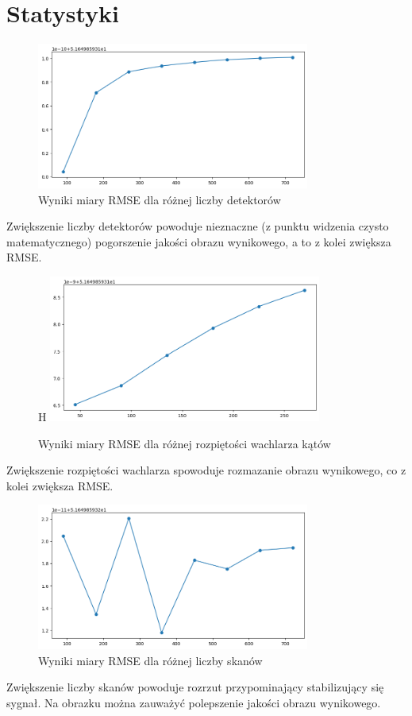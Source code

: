 \documentclass[11pt,a4paper]{article}
\begin{document}
    \section{Statystyki}
    \begin{figure}[H]
        \centering
        \includegraphics[width=0.8\textwidth]{rmse_detectors}
        \caption{Wyniki miary RMSE dla różnej liczby detektorów}
    \end{figure}
    Zwiększenie liczby detektorów powoduje nieznaczne (z punktu widzenia czysto matematycznego) pogorszenie
    jakości obrazu wynikowego, a to z kolei zwiększa RMSE.
    \begin{figure}{H}
        \centering
        \includegraphics[width=0.8\textwidth]{mse_fan}
        \caption{Wyniki miary RMSE dla różnej rozpiętości wachlarza kątów}
    \end{figure}
    Zwiększenie rozpiętości wachlarza spowoduje rozmazanie obrazu wynikowego, co z kolei zwiększa RMSE.

    \begin{figure}[H]
        \centering
        \includegraphics[width=0.8\textwidth]{mse_amount}
        \caption{Wyniki miary RMSE dla różnej liczby skanów}
    \end{figure}

    Zwiększenie liczby skanów powoduje rozrzut przypominający stabilizujący się sygnał.
    Na obrazku można zauważyć polepszenie jakości obrazu wynikowego.
\end{document}
